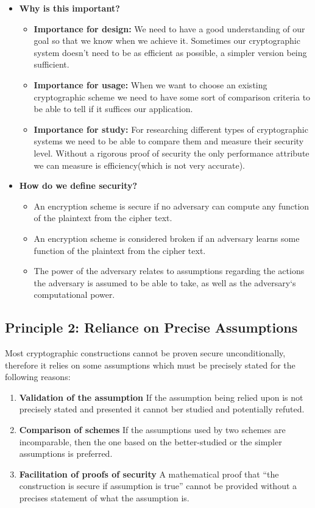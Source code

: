 \begin{itemize}
    \item \textbf{Why is this important?}
    \begin{itemize}
        \item \textbf{Importance for design:} We need to have a good understanding of our goal so that
we know when we achieve it. Sometimes our cryptographic system doesn't need to
be as efficient as possible, a simpler version being sufficient.
        \item \textbf{Importance for usage:} When we want to choose an existing cryptographic scheme
we need to have some sort of comparison criteria to be able to tell if it suffices our
application.
        \item \textbf{Importance for study:} For researching different types of cryptographic systems
we need to be able to compare them and measure their security level. Without
a rigorous proof of security the only performance attribute we can measure is
efficiency(which is not very accurate).
    \end{itemize}
    \item \textbf{How do we define security?}
    \begin{itemize}
        \item An encryption scheme is secure if no adversary can compute any function of the
plaintext from the cipher text.
        \item An encryption scheme is considered broken if an adversary learns some function of
the plaintext from the cipher text.
        \item The power of the adversary relates to assumptions regarding the actions the
adversary is assumed to be able to take, as well as the adversary`s computational
power.
    \end{itemize}
\end{itemize}

\subsection{Principle 2: Reliance on Precise Assumptions}

Most cryptographic constructions cannot be proven secure unconditionally, therefore it relies on some assumptions which must be precisely stated for the following reasons:

\begin{enumerate}
\item \textbf{Validation of the assumption} If the assumption being relied upon is not precisely stated and presented it cannot ber studied and potentially refuted.
\item \textbf{Comparison of schemes} If the assumptions used by two schemes are incomparable, then the one based on the better-studied or the simpler assumptions is preferred.
\item \textbf{Facilitation of proofs of security} A mathematical proof that ``the construction is secure if assumption is true'' cannot be provided without a precises statement of what the assumption is.
\end{enumerate}

